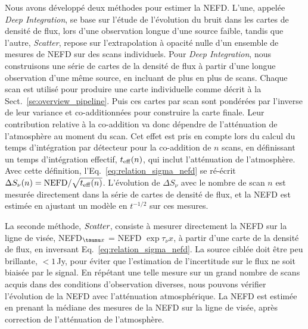 Nous avons développé deux méthodes pour estimer la NEFD. L'une,
appelée \emph{Deep Integration}, se base sur l'étude de l'évolution du
bruit dans les cartes de densité de flux, lors d'une observation
longue d'une source faible, tandis que l'autre, \emph{Scatter}, repose
sur l'extrapolation à opacité nulle d'un ensemble de mesures de NEFD
sur des scans individuels.
Pour \emph{Deep Integration}, nous construisons une série de cartes de
la densité de flux à partir d'une longue observation d'une même source, en
incluant de plus en plus de scans. Chaque scan est utilisé pour
produire une carte individuelle comme décrit à la
Sect.~\ref{se:overview_pipeline}. Puis ces cartes par scan sont
pondérées par l'inverse de leur variance et co-additionnées pour
construire la carte finale. Leur contribution relative à la
co-addition va donc dépendre de l'atténuation de l'atmosphère au
moment du scan. Cet effet est pris en compte lors du calcul du temps
d'intégration par détecteur pour la co-addition de $n$ scans, en
définissant un temps d'intégration effectif, $t_{\rm{eff}} (n)$, qui
inclut l'atténuation de l'atmosphère. Avec cette définition, 
l'Eq.~\ref{eq:relation_sigma_nefd} se ré-écrit
$\Delta S_\nu (n) = {\rm{NEFD}} / \sqrt{t_{\rm{eff}}(n)}$.
L'évolution de $\Delta S_\nu$ avec le nombre de scan $n$ est mesurée
directement dans la série de cartes de densité de flux, et la NEFD est
estimée en ajustant un modèle en $t^{-1/2}$ sur ces mesures.

La seconde méthode, $\emph{Scatter}$, consiste à mesurer directement
la NEFD sur la ligne de visée, NEFD$_{\taunu x}$ = NEFD $\exp{ \tau_{\nu} x}$, à partir
d'une carte de la densité de flux, en inversant
Eq.~\ref{eq:relation_sigma_nefd}. La source ciblée doit être peu
brillante, $<1\,$Jy, pour éviter que l'estimation de l'incertitude sur
le flux ne soit biaisée par le signal. En répétant une telle mesure
sur un grand nombre de scans acquis dans des conditions d'observation
diverses, nous pouvons vérifier l'évolution de la NEFD avec
l'atténuation atmosphérique. La NEFD est estimée en prenant la médiane
des mesures de la NEFD sur la ligne de visée, après correction de
l'atténuation de l'atmosphère.    


